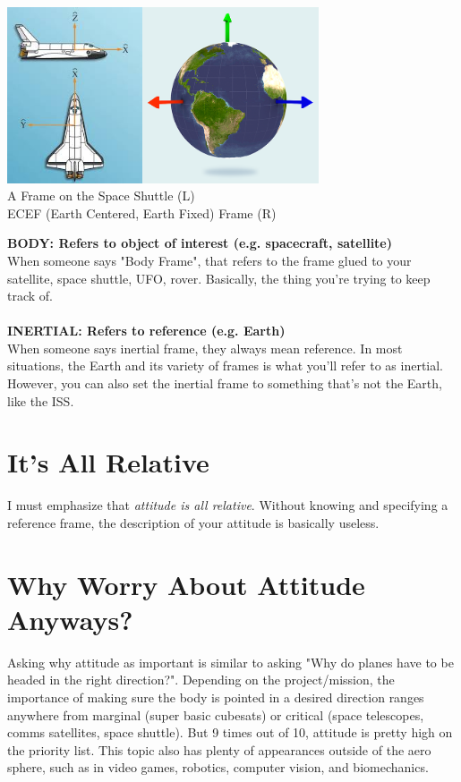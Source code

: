 \documentclass[a4paper,14pt]{extreport}
\begin{document}
\begin{center}
\includegraphics[width=4cm]{shuttle_body_frame}\includegraphics[height=5.2cm]{ecef}\\
A Frame on the Space Shuttle (L) \\ ECEF (Earth Centered, Earth Fixed) Frame (R)
\end{center}
\textbf{BODY: Refers to object of interest (e.g. spacecraft, satellite)}\\
When someone says "Body Frame", that refers to the frame glued to your satellite, space shuttle, UFO, rover. Basically, the thing you're trying to keep track of.\\\\
\textbf{INERTIAL: Refers to reference (e.g. Earth)}\\
When someone says inertial frame, they always mean reference. In most situations, the Earth and its variety of frames is what you'll refer to as inertial. However, you can also set the inertial frame to something that's not the Earth, like the ISS.\\

\section{It's All Relative}
I must emphasize that \emph{attitude is all relative}. Without knowing and specifying a reference frame, the description of your attitude is basically useless. 

\section{Why Worry About Attitude Anyways?}
Asking why attitude as important is similar to asking "Why do planes have to be headed in the right direction?". Depending on the project/mission, the importance of making sure the body is pointed in a desired direction ranges anywhere from marginal (super basic cubesats) or critical (space telescopes, comms satellites, space shuttle). But 9 times out of 10, attitude is pretty high on the priority list. This topic also has plenty of appearances outside of the aero sphere, such as in video games, robotics, computer vision, and biomechanics.
\end{document}
